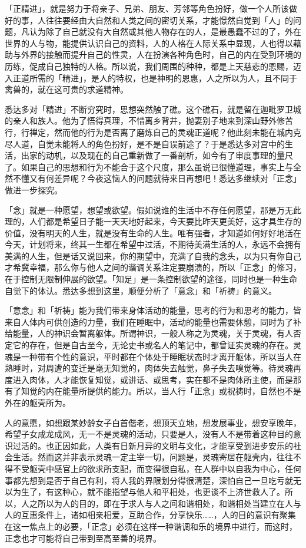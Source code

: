 \documentclass[12pt,twoside,openany]{book}
\begin{document}
「正精进」，就是努力于将亲子、兄弟、朋友、芳邻等角色扮好，做一个人所该做好的事，人往往要经由大自然和人类之间的密切关系，才能憬然自觉到「人」的问题，凡认为除了自己就没有大自然或其他人物存在的人，是最愚蠢不过的了，外在世界的人与物，能提供认识自己的资料，人的人格在人际关系中显现，人也得以藉助与外界的接触而提升自己的性灵，人在扮演各种角色时，自己的内在受到环境的历练，促成自己独特的人格。所以说，我们周围的种种，都是上天慈悲的恩赐，迈入正道所需的「精进」，是人的特权，也是神明的恩惠，人之所以为人，且不同于禽兽的，就在这可贵的求道精神。

悉达多对「精进」不断穷究时，思想突然触了礁。这个礁石，就是留在迦毗罗卫城的亲人和族人。他为了悟得真理，不惜离乡背井，抛妻别子地来到深山野外修苦行，行禅定，然而他的行为是否离了磨炼自己的灵魂正道呢？他此刻未能在城内克尽人道，自觉未能将人的角色扮好，是不是自误前途了？于是悉达多对宫中的生活，出家的动机，以及现在的自己重新做了一番剖析，如今有了审度事理的量尺了。如果自己的思想和行为不能合于这个尺度，那么虽说已很懂道理，事实上与全然不懂又有何差异呢？今夜这恼人的问题就待来日再想吧！悉达多继续对「正念」做进一步探究。

「念」就是一种愿望，想望或欲望。假如说谁的生活中不存任何愿望，那是万无此理的，人们都是希望日子能一天天地好起来，今天要比昨天更美好，这才具生存的价值，没有明天的人生，就是没有生命的人生。唯有强者，才知道如何好好地活在今天，计划将来，终其一生都在希望中过活，不期待美满生活的人，永远不会拥有美满的人生，但是话又说回来，你的期望中，充满了自我的念头，以为只有你自己才希冀幸福，那么你与他人之间的谐调关系注定要崩溃的，所以「正念」的修习，在于控制无限制伸展的欲望。「知足」是一条控制欲望的途径，同时也是一种生命自觉下的体认。悉达多想到这里，顺便分析了「意念」和「祈祷」的意义。

「意念」和「祈祷」能为我们带来身体活动的能量，思考的行为和思考的能力，皆来自人体内可供创造的力量，我们在睡眠中，活动的能量也需要休憩，同时为了补给能量，人的神识会暂离躯体。所谓神识，一般人称之为灵魂，关于灵魂，有人否定它的存在，但是自古至今，无论史书或名人的笔记中，都曾证实灵魂的存在。灵魂是一种带有个性的意识，平时都在个体处于睡眠状态时才离开躯体，所以当人在熟睡时，对周遭的变迁是毫无知觉的，肉体失去触觉，鼻子失去嗅觉等。待灵魂再度进入肉体，人才能恢复知觉，或讲话、或思考，实在都不是肉体所主使，而是那有了知觉的内在能量所提供的能力。所以，当人行「正念」或祝祷时，自然也不是外在的躯壳所为。

人的意愿，如想跟某妙龄女子白首偕老，想顶天立地，想发展事业，想安享晚年，希望子女成龙成风，无一不是灵魂的活动，只要是人，没有人不是带着这种目的意识过活的。也正因如此，人类有日新月异的文明与文化，才能享受到进步安乐的社会生活。然而这并非表示灵魂一定主宰一切，问题是，灵魂寄居在躯壳内，往往不得不受躯壳中感官上的欲求所支配，而变得很自私，在人群中以自我为中心，任何事都先想到是否于自己有利，将人我的界限划分得很清楚，深怕自己一旦吃亏就无以为生了，有这种心，就不能指望与他人和平相处，也更谈不上济世救人了。所以，人之所以为人的目的，即在于求人与人之间和谐相处，和谐相处当建立在人与人的互惠条件上，诸如相亲相爱，互助合作，分享快乐……，人的目的意识有聚集在这一焦点上的必要，「正念」必须在这样一种谐调和乐的境界中进行，而这时，正念也才可能将自己带到至高至善的境界。
\end{document}
